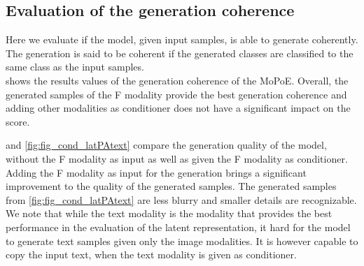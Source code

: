 %

\subsection{Evaluation of the generation coherence}

Here we evaluate if the model, given input samples, is able to generate coherently.
The generation is said to be coherent if the generated classes are classified to the same class as the input samples.\\
 shows the results values of the generation coherence of the MoPoE.
Overall, the generated samples of the F modality provide the best generation coherence and adding other modalities as conditioner does not have a significant impact on the score.

 and \cref{fig:fig_cond_latPAtext} compare the generation quality of the model, without the F modality as input as well as given the F modality as conditioner.
Adding the F modality as input for the generation brings a significant improvement to the quality of the generated samples.
The generated samples from \cref{fig:fig_cond_latPAtext} are less blurry and smaller details are recognizable.
We note that while the text modality is the modality that provides the best performance in the evaluation of the latent representation, it hard for the model to generate text samples given only the image modalities.
It is however capable to copy the input text, when the text modality is given as conditioner.


